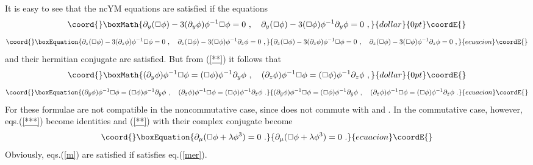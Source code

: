 \documentclass[a4paper,11pt]{article}
\numberwithin{equation}{section}
\def\l{\lambda}
\def\p{\phi}
\def\m{\mu}
\def\pa{\partial}
\providecommand{\zb}{{\bar{z}}}
\providecommand{\yb}{{\bar{y}}}
\begin{document}
It is easy to see that the ncYM equations are satisfied if the equations
$$\coord{}\boxMath{
\pa_y(\Box\p) - 3 (\pa_y\p)\p^{-1}\Box\p = 0\ , \quad 
\pa_y(\Box\p)- 3(\Box\p)\p^{-1}\pa_y\p =0\ ,
}{dollar}{0pt}\coordE{}$$ 
\begin{equation}\coord{}\boxEquation{\label{**}
\pa_z(\Box\p) - 3 (\pa_z\p)\p^{-1}\Box\p = 0\ , \quad  
\pa_z(\Box\p) - 3(\Box\p)\p^{-1}\pa_z\p  =0\ ,
}{\pa_z(\Box\p) - 3 (\pa_z\p)\p^{-1}\Box\p = 0\ , \quad  
\pa_z(\Box\p) - 3(\Box\p)\p^{-1}\pa_z\p  =0\ ,
}{ecuacion}\coordE{}\end{equation}  
and their hermitian conjugate are satisfied. But from (\ref{**}) it follows that
$$\coord{}\boxMath{
(\pa_y\p)\p^{-1}\Box\p = (\Box\p)\p^{-1}\pa_y\p \ ,\quad 
(\pa_z\p)\p^{-1}\Box\p = (\Box\p)\p^{-1}\pa_z\p  \ ,
}{dollar}{0pt}\coordE{}$$ 
\begin{equation}\coord{}\boxEquation{\label{***}
(\pa_\yb\p)\p^{-1}\Box\p = (\Box\p)\p^{-1}\pa_\yb\p \ ,\quad 
(\pa_\zb\p)\p^{-1}\Box\p = (\Box\p)\p^{-1}\pa_\zb\p  \ .
}{(\pa_\yb\p)\p^{-1}\Box\p = (\Box\p)\p^{-1}\pa_\yb\p \ ,\quad 
(\pa_\zb\p)\p^{-1}\Box\p = (\Box\p)\p^{-1}\pa_\zb\p  \ .
}{ecuacion}\coordE{}\end{equation} 
{}For \myHighlight{$\Box\p\ne 0$}\coordHE{} these formulae are not compatible in the noncommutative case, 
since \myHighlight{$\pa_\m\p$}\coordHE{} does not commute with \myHighlight{$\p^{-1}$}\coordHE{} and \myHighlight{$\Box\p$}\coordHE{}. In 
the commutative case, however, eqs.(\ref{***}) become identities
and  (\ref{**}) with their complex conjugate become
\begin{equation}\coord{}\boxEquation{\label{m}
\pa_\m (\Box\p + \l\p^3) =0\ .
}{\pa_\m (\Box\p + \l\p^3) =0\ .
}{ecuacion}\coordE{}\end{equation}
Obviously, eqs.(\ref{m}) are satisfied if \myHighlight{$\p$}\coordHE{} satisfies  eq.(\ref{mer}).


\medskip
\end{document}
